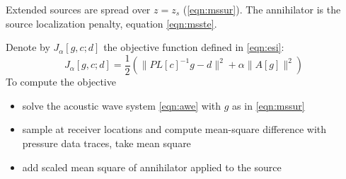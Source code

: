 Extended sources are spread over $z=z_s$ (\ref{eqn:mssur}). The annihilator is the source localization penalty, equation \ref{eqn:msste}.

Denote by $J_{\alpha}[g,c;d]$ the objective function defined in \ref{eqn:esi}:
\begin{equation}
\label{eqn:jdef}
J_{\alpha}[g,c;d] = \frac{1}{2}( \|PL[c]^{-1}g -d \|^2 + \alpha \|A[g]\|^2) 
\end{equation}
To compute the objective 
\begin{itemize}
\item solve the acoustic wave system \ref{eqn:awe} with $g$ as in \ref{eqn:mssur}
\item sample at receiver locations and compute mean-square difference with pressure data traces, take mean square
\item add scaled mean square of annihilator applied to the source
\end{itemize}

